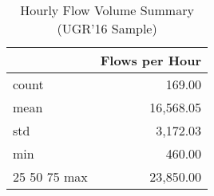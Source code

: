 \begin{table}
\caption{Hourly Flow Volume Summary (UGR'16 Sample)}
\label{tab:ugr16_temporal_stats}
\begin{tabular}{lr}
\toprule
 & Flows per Hour \\
\midrule
count & 169.00 \\
mean & 16,568.05 \\
std & 3,172.03 \\
min & 460.00 \\
25%
50%
75%
max & 23,850.00 \\
\bottomrule
\end{tabular}
\end{table}
